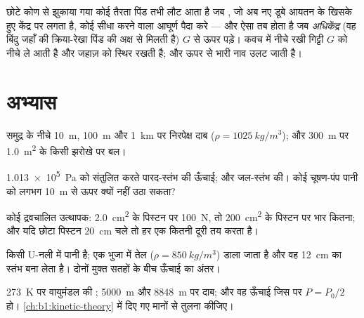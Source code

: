 \begin{remark}[स्थायित्व]\label{rem:b1:fluid-statics:stability}
छोटे कोण से झुकाया गया कोई तैरता पिंड तभी लौट आता है जब , जो
अब नए डूबे आयतन के खिसके हुए केंद्र पर लगता है, कोई सीधा करने वाला आघूर्ण
पैदा करे --- और ऐसा तब होता है जब \emph{अधिकेंद्र} (वह बिंदु जहाँ  की क्रिया-रेखा पिंड की अक्ष से मिलती है) $G$ से ऊपर पड़े। कवच में नीचे
रखी गिट्टी $G$ को नीचे ले आती है और जहाज़ को स्थिर रखती है; और ऊपर से भारी
नाव उलट जाती है।
\end{remark}

\section{अभ्यास}

\begin{exercise}[$\star$]\label{exo:b1:fluid-statics:1}
समुद्र के नीचे \qty{10}{m}, \qty{100}{m} और \qty{1}{km} पर निरपेक्ष दाब
($\rho = \qty{1025}{kg/m^3}$); और \qty{300}{m} पर \qty{1.0}{m^2} के किसी
झरोखे पर बल।
\end{exercise}

\begin{exercise}[$\star$]\label{exo:b1:fluid-statics:2}
\qty{1.013e5}{Pa} को संतुलित करते पारद-स्तंभ की ऊँचाई; और जल-स्तंभ की।
कोई चूषण-पंप पानी को लगभग \qty{10}{m} से ऊपर क्यों नहीं उठा सकता?
\end{exercise}

\begin{exercise}[$\star$]\label{exo:b1:fluid-statics:3}
कोई द्रवचालित उत्थापक: \qty{2.0}{cm^2} के पिस्टन पर \qty{100}{N}, तो
\qty{200}{cm^2} के पिस्टन पर भार कितना; और यदि छोटा पिस्टन \qty{20}{cm}
चले तो हर एक कितनी दूरी तय करता है।
\end{exercise}

\begin{exercise}[$\star$]\label{exo:b1:fluid-statics:4}
किसी U-नली में पानी है; एक भुजा में तेल ($\rho = \qty{850}{kg/m^3}$) डाला
जाता है और वह \qty{12}{cm} का स्तंभ बना लेता है। दोनों मुक्त सतहों के बीच
ऊँचाई का अंतर।
\end{exercise}

\begin{exercise}[$\star\star$]\label{exo:b1:fluid-statics:5}
\qty{273}{K} पर वायुमंडल की ; \qty{5000}{m} और \qty{8848}{m} पर
दाब; और वह ऊँचाई जिस पर $P = P_0/2$ हो। \cref{ch:b1:kinetic-theory} में दिए
गए मानों से तुलना कीजिए।
\end{exercise}

